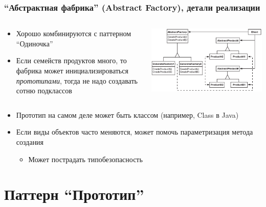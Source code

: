 \documentclass[xetex,mathserif,serif]{beamer}
\begin{document}
	\begin{frame}
		\frametitle{``Абстрактная фабрика'' (Abstract Factory), детали реализации}
		\begin{columns}
			\begin{column}{0.5\textwidth}
				\begin{itemize}
					\item Хорошо комбинируются с паттерном ``Одиночка''
					\item Если семейств продуктов много, то фабрика может инициализироваться \textit{прототипами}, тогда не надо создавать сотню подклассов
				\end{itemize}
			\end{column}
			\begin{column}{0.5\textwidth}
				\begin{center}
					\includegraphics[width=\textwidth]{abstractFactory.png}
				\end{center}
			\end{column}
		\end{columns}
		\begin{itemize}
			\item Прототип на самом деле может быть классом (например, Class в Java)
			\item Если виды объектов часто меняются, может помочь параметризация метода создания
			\begin{itemize}
				\item Может пострадать типобезопасность
			\end{itemize}
		\end{itemize}
	\end{frame}

	\section{Паттерн ``Прототип''}
	
\end{document}

